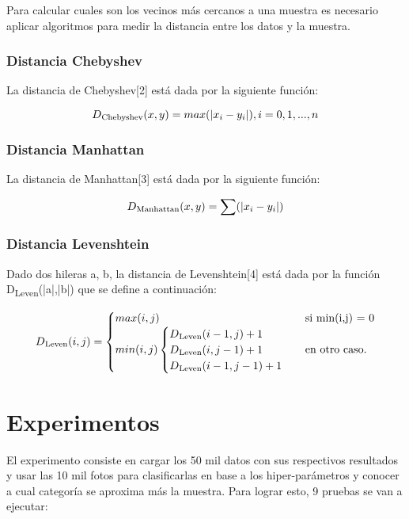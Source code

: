 \documentclass[conference]{IEEEtran}
\begin{document}
Para calcular cuales son los vecinos más cercanos a una muestra es necesario aplicar algoritmos para medir la distancia entre los datos y la muestra.

\subsubsection{Distancia Chebyshev}

La distancia de Chebyshev[2] está dada por la siguiente función:

\[ D\textsubscript{Chebyshev}(x,y) = max(|x_i-y_i|) , i=0,1,...,n \]

\subsubsection{Distancia Manhattan}

La distancia de Manhattan[3] está dada por la siguiente función:

\[ D\textsubscript{Manhattan}(x,y) = \sum(|x_i-y_i|) \]

\subsubsection{Distancia Levenshtein}

Dado dos hileras a, b, la distancia de Levenshtein[4] está dada por la función D\textsubscript{Leven}(|a|,|b|) que se define a continuación:

\[ D\textsubscript{Leven}(i,j) = 
	\begin{cases}
        max(i,j) & \textrm{si min(i,j) = 0} \\
        min(i,j) 
        \begin{cases}
            D\textsubscript{Leven}(i-1,j)+1\\
            D\textsubscript{Leven}(i,j-1)+1\\
            D\textsubscript{Leven}(i-1,j-1)+1
        \end{cases}
        		& \textrm{en otro caso.}
    \end{cases}	
\]

\section{Experimentos}

El experimento consiste en cargar los 50 mil datos con sus respectivos resultados y usar las 10 mil fotos para clasificarlas en base a los hiper-parámetros y conocer a cual categoría se aproxima más la muestra. Para lograr esto, 9 pruebas se van a ejecutar:
\end{document}
